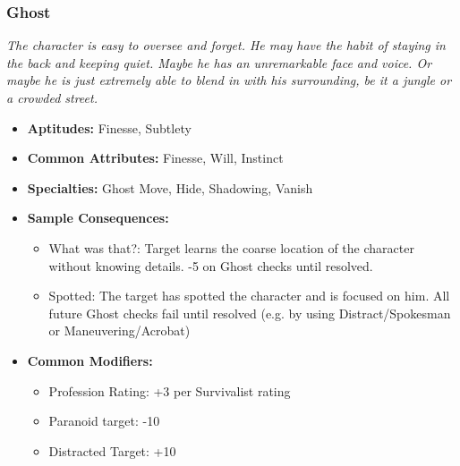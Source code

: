 \subsubsection{Ghost}\label{Ghost}
\textit{The character is easy to oversee and forget.
He may have the habit of staying in the back and keeping quiet.
Maybe he has an unremarkable face and voice.
Or maybe he is just extremely able to blend in with his surrounding, be it a jungle or a crowded street.}
\begin{itemize}
	\item \textbf{Aptitudes:} Finesse, Subtlety
	\item \textbf{Common Attributes:} Finesse, Will, Instinct
	\item \textbf{Specialties:} Ghost Move, Hide, Shadowing, Vanish
	\item \textbf{Sample Consequences:} 
	\begin{itemize}
		\item What was that?: Target learns the coarse location of the character without knowing details. -5 on Ghost checks until resolved.
		\item Spotted: The target has spotted the character and is focused on him. All future Ghost checks fail until resolved (e.g. by using Distract/Spokesman or Maneuvering/Acrobat)
	\end{itemize}
	\item \textbf{Common Modifiers:}
	\begin{itemize}
		\item Profession Rating: +3 per Survivalist rating
		\item Paranoid target: -10
		\item Distracted Target: +10
	\end{itemize}
\end{itemize}

